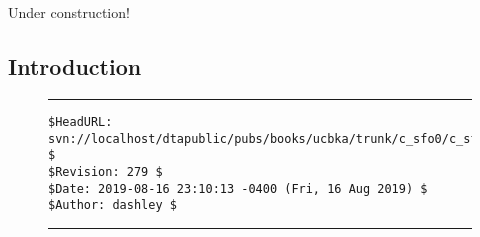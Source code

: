 
\chapter{\csfozerolongtitle{}}

\label{csfo0}

                     {Under construction!}

\section{Introduction}



\vfill
\noindent\begin{figure}[!b]
\noindent\rule[-0.25in]{\textwidth}{1pt}
\begin{tiny}
\begin{verbatim}
$HeadURL: svn://localhost/dtapublic/pubs/books/ucbka/trunk/c_sfo0/c_sfo0.tex $
$Revision: 279 $
$Date: 2019-08-16 23:10:13 -0400 (Fri, 16 Aug 2019) $
$Author: dashley $
\end{verbatim}
\end{tiny}
\noindent\rule[0.25in]{\textwidth}{1pt}
\end{figure}

%
